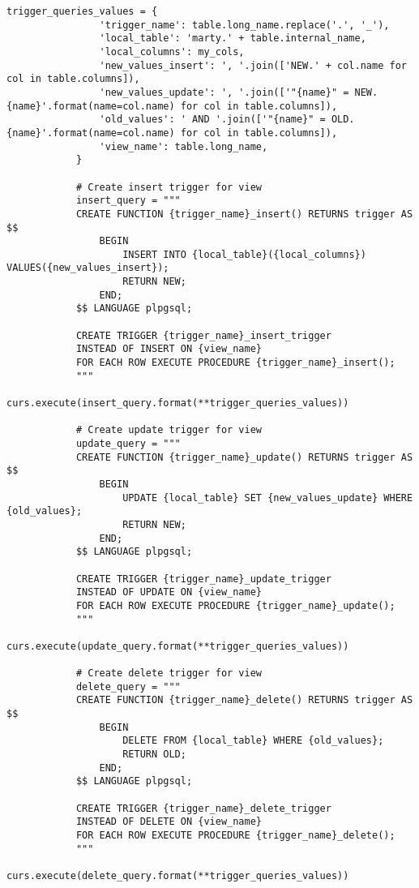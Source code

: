 \begin{lstlisting}[caption={utils/populator.py}]
            trigger_queries_values = {
                'trigger_name': table.long_name.replace('.', '_'),
                'local_table': 'marty.' + table.internal_name,
                'local_columns': my_cols,
                'new_values_insert': ', '.join(['NEW.' + col.name for col in table.columns]),
                'new_values_update': ', '.join(['"{name}" = NEW.{name}'.format(name=col.name) for col in table.columns]),
                'old_values': ' AND '.join(['"{name}" = OLD.{name}'.format(name=col.name) for col in table.columns]),
                'view_name': table.long_name,
            }

            # Create insert trigger for view
            insert_query = """
            CREATE FUNCTION {trigger_name}_insert() RETURNS trigger AS $$
                BEGIN
                    INSERT INTO {local_table}({local_columns}) VALUES({new_values_insert});
                    RETURN NEW;
                END;
            $$ LANGUAGE plpgsql;

            CREATE TRIGGER {trigger_name}_insert_trigger
            INSTEAD OF INSERT ON {view_name}
            FOR EACH ROW EXECUTE PROCEDURE {trigger_name}_insert();
            """
            curs.execute(insert_query.format(**trigger_queries_values))

            # Create update trigger for view
            update_query = """
            CREATE FUNCTION {trigger_name}_update() RETURNS trigger AS $$
                BEGIN
                    UPDATE {local_table} SET {new_values_update} WHERE {old_values};
                    RETURN NEW;
                END;
            $$ LANGUAGE plpgsql;

            CREATE TRIGGER {trigger_name}_update_trigger
            INSTEAD OF UPDATE ON {view_name}
            FOR EACH ROW EXECUTE PROCEDURE {trigger_name}_update();
            """
            curs.execute(update_query.format(**trigger_queries_values))

            # Create delete trigger for view
            delete_query = """
            CREATE FUNCTION {trigger_name}_delete() RETURNS trigger AS $$
                BEGIN
                    DELETE FROM {local_table} WHERE {old_values};
                    RETURN OLD;
                END;
            $$ LANGUAGE plpgsql;

            CREATE TRIGGER {trigger_name}_delete_trigger
            INSTEAD OF DELETE ON {view_name}
            FOR EACH ROW EXECUTE PROCEDURE {trigger_name}_delete();
            """
            curs.execute(delete_query.format(**trigger_queries_values))
\end{lstlisting}